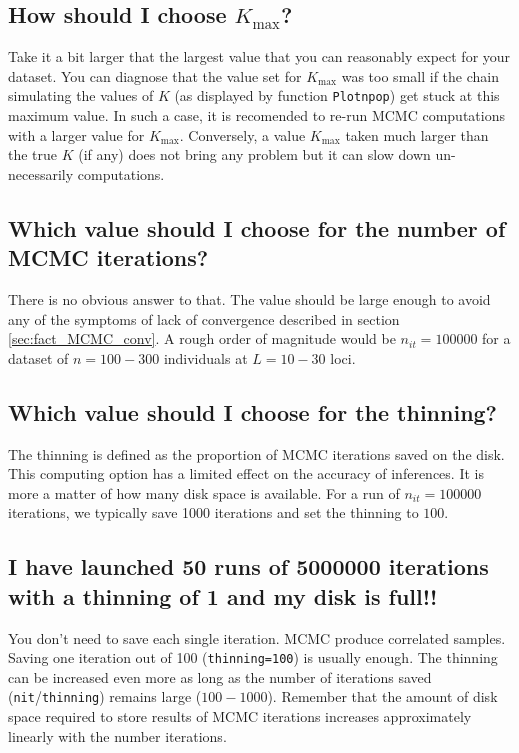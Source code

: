 \documentclass{article}
\begin{document}
\subsection{How should I choose $K_{\max}$?}\label{sec:faqKmax}

Take it a bit larger that the largest value that you can reasonably expect for your dataset. 
You can diagnose that the value set for $K_{\max}$ was too small if the chain simulating the values of $K$ (as displayed by function \texttt{Plotnpop})  
get stuck at this maximum value. In such a case, it is recomended to re-run MCMC computations with a larger value for $K_{\max}$.
Conversely, a value $K_{\max}$ taken much larger than the true $K$ (if any) does not bring any problem 
but it can slow down un-necessarily computations. 

\subsection[Number of iterations]{Which value should I choose for the number of MCMC iterations?}\label{sec:faqnit}
There is no obvious answer to that. The value should be large enough to avoid any of the symptoms of 
lack of convergence described in section \ref{sec:fact_MCMC_conv}. 
A rough order of magnitude would be $n_{it}=100000$ for a dataset of $n=100-300$ individuals at $L=10-30$ loci. 

\subsection[MCMC thinning]{Which value should I choose for the thinning?}\label{sec:faqthinning}
The thinning is defined as the proportion of MCMC iterations saved on the disk. 
This computing option has a limited effect on the accuracy of inferences. It is more a matter of how many disk space is available. 
For a run of  $n_{it}=100000$ iterations, we typically save 1000 iterations and set the thinning to $100$.  

\subsection[Storage]{I have launched 50 runs of  5000000 iterations with a thinning of 1 and my disk is full!!}

You don't need to save each single iteration. MCMC produce correlated samples. Saving one iteration out of 100 (\texttt{thinning=100}) 
is usually enough. 
The thinning can be increased even more as long as the number of iterations saved (\texttt{nit}/\texttt{thinning}) remains large ($100-1000$).
Remember that the amount of disk space required to store results of MCMC iterations increases approximately  linearly with the number iterations. 
\end{document}
